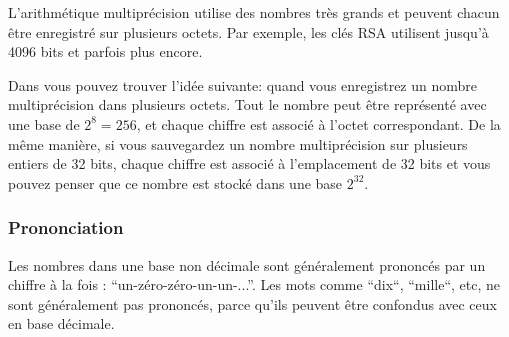 L'arithmétique multiprécision utilise des nombres très grands et peuvent chacun être enregistré sur plusieurs octets.
Par exemple, les clés RSA utilisent jusqu'à 4096 bits et parfois plus encore.

Dans  vous pouvez trouver l'idée suivante: quand vous enregistrez un nombre multiprécision dans plusieurs octets. Tout le nombre peut être représenté avec une base de $2^8=256$, et chaque chiffre est associé à l'octet correspondant.
De la même manière, si vous sauvegardez un nombre multiprécision sur plusieurs entiers de 32 bits, chaque chiffre est associé à l'emplacement de 32 bits et vous pouvez penser que ce nombre est stocké dans une base $2^{32}$.

\subsubsection{Prononciation}

Les nombres dans une base non décimale sont généralement prononcés par un chiffre à la fois : ``un-zéro-zéro-un-un-...''.
Les mots comme ``dix``, ``mille``, etc, ne sont généralement pas prononcés, parce qu'ils peuvent être confondus avec ceux en base décimale.

